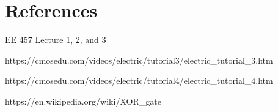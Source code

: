 \documentclass{article}
\begin{document}
\newpage
\section{References}

\noindent [\text{1}] EE 457 Lecture 1, 2, and 3

\noindent [\text{2}] https://cmosedu.com/videos/electric/tutorial3/electric\_tutorial\_3.htm 

\noindent [\text{3}] https://cmosedu.com/videos/electric/tutorial4/electric\_tutorial\_4.htm 

\noindent [\text{4}] https://en.wikipedia.org/wiki/XOR\_gate 

























\begin{comment}
\paragraph{}
There is some inline code, \inlinecode{movff STATUS, STATUS\_TEMP}, in this sentence.

This formula $f(x) = x^2$ is an example of inline math.

\end{comment}


\begin{comment}

\begin{equation*}
P_{1f_m}=\int^\infty_{-\infty}G_{1f_m}(f)df=0.01\int^\infty_{-\infty}[\delta(f-2700)+\delta(f-2300)]df=0.01*(1+1)=0.02W
\end{equation*}


\end{comment}


\begin{comment}

\begin{figure}[H]
  \centering
  \texttt{[image: screenshots/01.png]}
  \caption{The system for this lab.}
  \label{fig:01}
\end{figure}

\end{comment}
\end{document}
